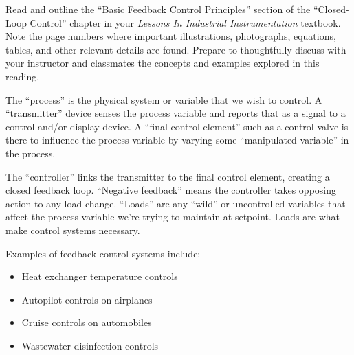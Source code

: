 

Read and outline the ``Basic Feedback Control Principles'' section of the ``Closed-Loop Control'' chapter in your {\it Lessons In Industrial Instrumentation} textbook.  Note the page numbers where important illustrations, photographs, equations, tables, and other relevant details are found.  Prepare to thoughtfully discuss with your instructor and classmates the concepts and examples explored in this reading.














The ``process'' is the physical system or variable that we wish to control.  A ``transmitter'' device senses the process variable and reports that as a signal to a control and/or display device.  A ``final control element'' such as a control valve is there to influence the process variable by varying some ``manipulated variable'' in the process.  

\vskip 10pt

The ``controller'' links the transmitter to the final control element, creating a closed feedback loop.  ``Negative feedback'' means the controller takes opposing action to any load change.  ``Loads'' are any ``wild'' or uncontrolled variables that affect the process variable we're trying to maintain at setpoint.  Loads are what make control systems necessary.

\vskip 10pt

Examples of feedback control systems include:

\begin{itemize}
\item{} Heat exchanger temperature controls
\item{} Autopilot controls on airplanes
\item{} Cruise controls on automobiles
\item{} Wastewater disinfection controls
\end{itemize}

\vskip 10pt

